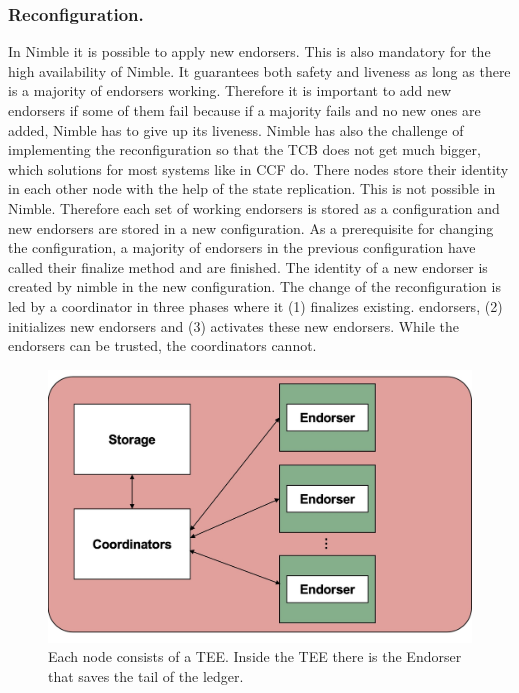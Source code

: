 	\subsubsection*{Reconfiguration.}
	In Nimble it is possible to apply new endorsers. This is also mandatory for the high availability of Nimble. It guarantees both safety and liveness as long as there is a majority of endorsers working. Therefore it is important to add new endorsers if some of them fail because if a majority fails and no new ones are added, Nimble has to give up its liveness. Nimble has also the challenge of implementing the reconfiguration so that the TCB does not get much bigger, which solutions for most systems like in CCF do. There nodes store their identity in each other node with the help of the state replication. This is not possible in Nimble. Therefore each set of working endorsers is stored as a configuration and new endorsers are stored in a new configuration. As a prerequisite for changing the configuration, a majority of endorsers in the previous configuration have called their finalize method and are finished. The identity of a new endorser is created by nimble in the new configuration. The change of the reconfiguration is led by a coordinator in three phases where it (1) finalizes existing. endorsers, (2) initializes new endorsers and (3) activates these new endorsers. While the endorsers can be trusted, the coordinators cannot. 
	
\begin{figure}[b]
	\includegraphics[scale=0.12]{pictures/nimble}
	\caption{Each node consists of a TEE. Inside the TEE there is the Endorser that saves the tail of the ledger.}
	\label{nimble}
\end{figure}

